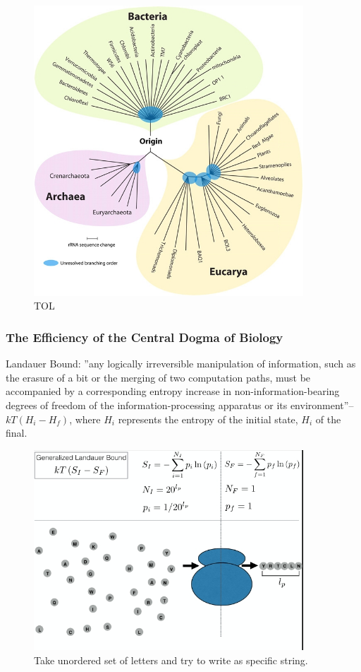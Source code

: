 \documentclass[]{article}
\begin{document}
\begin{figure}[H]
	\caption{TOL}\label{fig:TOL} 
	\includegraphics[width=0.9\textwidth]{TOL}
\end{figure}



\subsubsection{The Efficiency of the Central Dogma of Biology}

Landauer Bound: ''any logically irreversible manipulation of information, such as the erasure of a bit or the merging of two computation paths, must be accompanied by a corresponding entropy increase in non-information-bearing degrees of freedom of the information-processing apparatus or its environment''--$kT(H_i - H_f)$, where $H_i$ represents the entropy of the initial state, $H_i$ of the final\cite{wiki:landauer}\cite{bennett2003notes}\cite{landauer1961irreversibility}. 

\begin{figure}[H]
	\caption{Take unordered set of letters and try to write as specific string.}\label{fig:LandauerRibosome} 
	\includegraphics[width=0.9\textwidth]{LandauerRibosome}
\end{figure}
\end{document}

